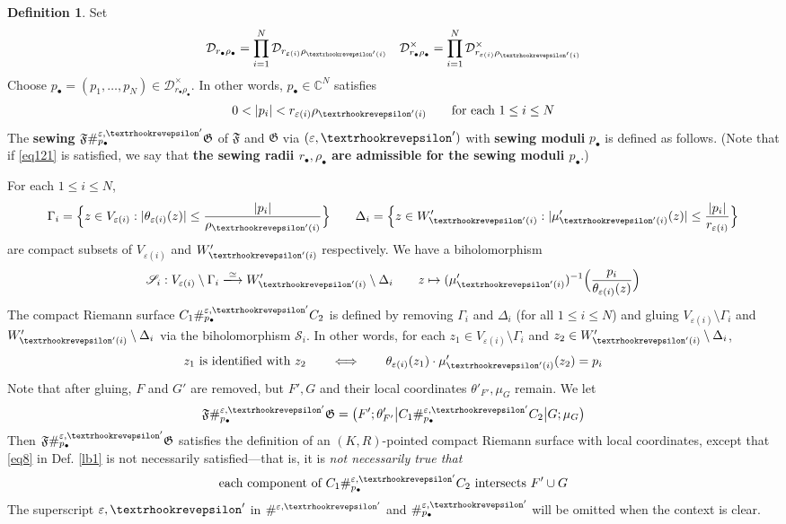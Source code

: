 \documentclass[11pt,b5paper,notitlepage]{article}
\theoremstyle{definition}
\newtheorem{df}{Definition}[section]
\theoremstyle{plain}
\newcommand{\scr}{\mathscr}
\newcommand{\blt}{\bullet}
\newcommand{\Cbb}{\mathbb C}
\newcommand{\<}{\left\langle}
\renewcommand{\>}{\right\rangle}
\newcommand{\MD}{\mathcal{D}}
\newcommand{\eps}{\varepsilon}
\newcommand{\ff}{\mathfrak{F}}
\newcommand{\fg}{\mathfrak{G}}
\newcommand{\tipae}{\text{\textrhookrevepsilon}}
\numberwithin{equation}{section}
\begin{document}
\begin{df}\label{lb11}
	Set
\begin{gather*}
	\MD_{r_\blt\rho_\blt}=\prod_{i=1}^N \MD_{r_{\eps(i)}\rho_{\tipae'(i)}}\quad 
	\MD^\times_{r_\blt\rho_\blt}=\prod_{i=1}^N \MD^\times_{r_{\eps(i)}\rho_{\tipae'(i)}}
\end{gather*}
Choose $p_\blt=(p_1,\dots,p_N)\in\MD_{r_\blt\rho_\blt}^\times$. In other words, $p_\blt\in\Cbb^N$ satisfies
\begin{align}\label{eq121}
0<|p_i|<r_{\eps(i)}\rho_{\tipae'(i)}\qquad\text{for each }1\leq i\leq N
\end{align}
The \textbf{sewing} $\ff\#^{\eps,\tipae'}_{p_\blt}\fg$ of $\ff$ and $\fg$ via $(\eps,\tipae')$ with \textbf{sewing moduli} $p_\blt$ is defined as follows. (Note that if \eqref{eq121} is satisfied, we say that \textbf{the sewing radii $r_\blt,\rho_\blt$ are admissible for the sewing moduli $p_\blt$}.)

For each $1\leq i\leq N$, 
\begin{align*}
\Gamma_i=\Big\{z\in V_{\eps(i)}:|\theta_{\eps(i)}(z)|\leq \frac{|p_i|}{\rho_{\tipae'(i)}} \Big\}
\qquad
\Delta_i=\Big\{z\in W'_{\tipae'(i)}:|\mu'_{\tipae'(i)}(z)|\leq \frac{|p_i|}{r_{\eps(i)}} \Big\}
\end{align*}
are compact subsets of $V_{\eps(i)}$ and $W'_{\tipae'(i)}$ respectively. We have a biholomorphism
\begin{align*}
\scr S_i: V_{\eps(i)}\setminus\Gamma_i\xlongrightarrow{\simeq} W'_{\tipae'(i)}\setminus\Delta_i\qquad z\mapsto (\mu'_{\tipae'(i)})^{-1}\Big(\frac{p_i}{\theta_{\eps(i)}(z)}\Big)
\end{align*}
The compact Riemann surface $C_1\#^{\eps,\tipae'}_{p_\blt}C_2$ is defined by removing $\Gamma_i$ and $\Delta_i$ (for all $1\leq i\leq N$) and gluing $V_{\eps(i)}\setminus\Gamma_i$ and $W'_{\tipae'(i)}\setminus\Delta_i$ via the biholomorphism $\scr S_i$. In other words, for each $z_1\in V_{\eps(i)}\setminus\Gamma_i$ and $z_2\in W'_{\tipae'(i)}\setminus\Delta_i$,
\begin{align}
\text{$z_1$ is identified with $z_2$}\qquad\Longleftrightarrow\qquad \theta_{\eps(i)}(z_1)\cdot \mu'_{\tipae'(i)}(z_2)=p_i
\end{align}
Note that after gluing, $F$ and $G'$ are removed, but $F',G$ and their local coordinates $\theta'_{F'},\mu_G$ remain. We let
\begin{align}
\ff\#^{\eps,\tipae'}_{p_\blt}\fg=\big(F';\theta'_{F'}\big|C_1\#^{\eps,\tipae'}_{p_\blt}C_2\big|G;\mu_G\big)
\end{align}
Then $\ff\#^{\eps,\tipae'}_{p_\blt}\fg$ satisfies the definition of an $(K,R)$-pointed compact Riemann surface with local coordinates, except that \eqref{eq8} in Def. \ref{lb1} is not necessarily satisfied---that is, it is \textit{not necessarily true that}
\begin{align}\label{eq114}
\text{each component of $C_1\#^{\eps,\tipae'}_{p_\blt}C_2$ intersects $F'\cup G$}
\end{align}
The superscript $\eps,\tipae'$ in $\#^{\eps,\tipae'}$ and $\#^{\eps,\tipae'}_{p_\blt}$ will be omitted when the context is clear.


\end{df}
\end{document}
